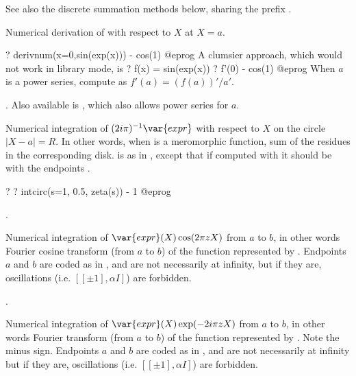 See also the discrete summation methods below, sharing the prefix .


\label{se:derivnum}
Numerical derivation of  with respect to $X$ at $X=a$.

\bprog
? derivnum(x=0,sin(exp(x))) - cos(1)
@eprog
A clumsier approach, which would not work in library mode, is
\bprog
? f(x) = sin(exp(x))
? f'(0) - cos(1)
@eprog
When $a$ is a power series, compute  as $f'(a) =
(f(a))'/a'$.

. Also
available is , which also allows power series for $a$.

\label{se:intcirc}
Numerical
integration of $(2i\pi)^{-1}\var{expr}$ with respect to $X$ on the circle
$|X-a| = R$.
In other words, when  is a meromorphic
function, sum of the residues in the corresponding disk.  is as in
, except that if computed with  it should be with
the endpoints \kbd{[-1, 1]}.

\bprog
? 
? intcirc(s=1, 0.5, zeta(s)) - 1
@eprog

.

\label{se:intfouriercos}
Numerical
integration of $\var{expr}(X)\cos(2\pi zX)$ from $a$ to $b$, in other words
Fourier cosine transform (from $a$ to $b$) of the function represented by
. Endpoints $a$ and $b$ are coded as in , and are not
necessarily at infinity, but if they are, oscillations (i.e. $[[\pm1],\alpha
I]$) are forbidden.

.

\label{se:intfourierexp}
Numerical
integration of $\var{expr}(X)\exp(-2i\pi zX)$ from $a$ to $b$, in other words
Fourier transform (from $a$ to $b$) of the function represented by
. Note the minus sign. Endpoints $a$ and $b$ are coded as in
, and are not necessarily at infinity but if they are,
oscillations (i.e. $[[\pm1],\alpha I]$) are forbidden.

